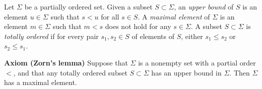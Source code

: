 \documentclass{ctexart}
\begin{document}
Let $\Sigma$ be a partially ordered set. Given a subset $S\subset \Sigma$, an \textit{upper bound} of $S$ is an element $u\in\Sigma$ such that $s<u$ for all $s\in S$. A \textit{maximal element} of $\Sigma$ is an element $m\in \Sigma$ such that $m<s$ does not hold for any $s\in\Sigma$. A subset $S\subset\Sigma$ is \textit{totally ordered} if for every pair $s_1,s_2\in S$ of elements of $S$, either $s_1\leq s_2$ or $s_2\leq s_1$.

\textbf{Axiom (Zorn's lemma)} Suppose that $\Sigma$ is a nonempty set with a partial order $<$, and that any totally ordered subset $S\subset\Sigma$ has an upper bound in $\Sigma$. Then $\Sigma$ has a maximal element.
\end{document}
